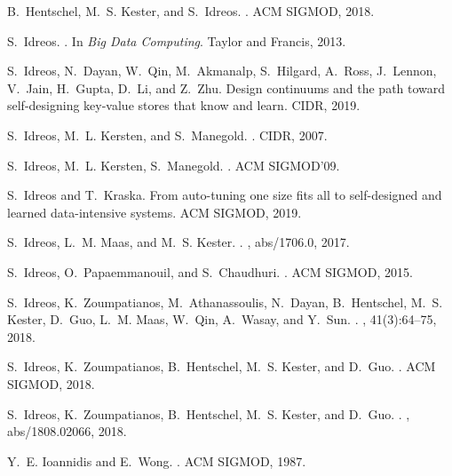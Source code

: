 \documentclass[11pt]{article}
\begin{document}
\begin{thebibliography}{10}
\begin{small}
B.~Hentschel, M.~S. Kester, and S.~Idreos.
.
\newblock ACM SIGMOD, 2018.

S.~Idreos.
.
\newblock In {\em Big Data Computing}. Taylor and Francis, 2013.

S.~Idreos, N.~Dayan, W.~Qin, M.~Akmanalp, S.~Hilgard, A.~Ross, J.~Lennon,
  V.~Jain, H.~Gupta, D.~Li, and Z.~Zhu.
\newblock Design continuums and the path toward self-designing key-value stores
  that know and learn.
\newblock CIDR, 2019.

S.~Idreos, M.~L. Kersten, and S.~Manegold.
.
\newblock CIDR, 2007.

S.~Idreos, M.~L. Kersten, S.~Manegold.
.
\newblock ACM SIGMOD'09.

S.~Idreos and T.~Kraska.
\newblock From auto-tuning one size fits all to self-designed and learned
  data-intensive systems.
\newblock ACM SIGMOD, 2019.

S.~Idreos, L.~M. Maas, and M.~S. Kester.
.
, abs/1706.0, 2017.

S.~Idreos, O.~Papaemmanouil, and S.~Chaudhuri.
.
\newblock ACM SIGMOD, 2015.

S.~Idreos, K.~Zoumpatianos, M.~Athanassoulis, N.~Dayan, B.~Hentschel, M.~S.
  Kester, D.~Guo, L.~M. Maas, W.~Qin, A.~Wasay, and Y.~Sun.
.
, 41(3):64--75, 2018.

S.~Idreos, K.~Zoumpatianos, B.~Hentschel, M.~S. Kester, and D.~Guo.
.
\newblock ACM SIGMOD, 2018.

S.~Idreos, K.~Zoumpatianos, B.~Hentschel, M.~S. Kester, and D.~Guo.
.
, abs/1808.02066, 2018.

Y.~E. Ioannidis and E.~Wong.
.
\newblock ACM SIGMOD, 1987.


\end{small}
\end{thebibliography}
\end{document}
